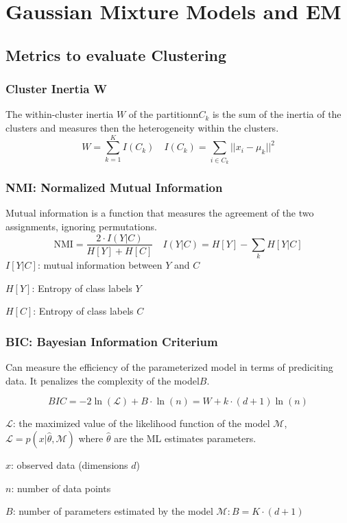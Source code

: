 \section{Gaussian Mixture Models and EM}
\subsection{Metrics to evaluate Clustering}
\subsubsection*{Cluster Inertia W}
The within-cluster inertia \(W\) of the partitionn\(C_k\) is the sum of the inertia of the clusters and measures then the heterogeneity within the clusters.
\[
W = \sum_{k = 1}^{K} I(C_k) \quad I(C_k) = \sum_{i\in C_k}||x_i - \mu_k||^2
\]
\subsubsection*{NMI: Normalized Mutual Information}
Mutual information is a function that measures the agreement of the two assignments, ignoring permutations.
\[
\text{NMI} = \frac{2\cdot I(Y|C)}{H\left[Y\right] + H\left[C\right]} \quad I(Y|C) = H\left[Y\right] - \sum_{k} H\left[Y|C\right]
\]
\(I\left[Y|C\right]\): mutual information between \(Y\) and \(C\)

\(H\left[Y\right]\): Entropy of class labels \(Y\)

\(H\left[C\right]\): Entropy of class labels \(C\)

\subsubsection*{BIC: Bayesian Information Criterium}
Can measure the efficiency of the parameterized model in terms of prediciting data.
It penalizes the complexity of the model\(B\).

\[
BIC = -2\ln(\mathcal{L}) + B \cdot \ln(n) = W + k \cdot(d+1)\ln(n)
\]

\(\mathcal{L}\): the maximized value of the likelihood function of the model \(\mathcal{M}\), \(\mathcal{L} = p(x|\hat{\theta},\mathcal{M})\) where \(\hat{\theta}\) are the ML estimates parameters.

\(x\): observed data (dimensions \(d\))

\(n\): number of data points

\(B\): number of parameters estimated by the model \(\mathcal{M}:B = K \cdot (d+1)\)

